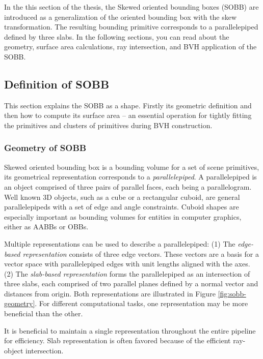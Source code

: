 In the this section of the thesis, the Skewed oriented bounding boxes (SOBB) \cite{KB25} are introduced as a generalization of the oriented bounding box with the skew transformation. The resulting bounding primitive corresponds to a parallelepiped defined by three slabs. In the following sections, you can read about the geometry, surface area calculations, ray intersection, and BVH application of the SOBB.

\subsection{Definition of SOBB}

This section explains the SOBB as a shape. Firstly its geometric definition and then how to compute its surface area -- an essential operation for tightly fitting the primitives and clusters of primitives during BVH construction.

\subsubsection{Geometry of SOBB}

Skewed oriented bounding box is a bounding volume for a set of scene primitives, its geometrical representation corresponds to a \textit{parallelepiped}. A parallelepiped is an object comprised of three pairs of parallel faces, each being a parallelogram. Well known 3D objects, such as a cube or a rectangular cuboid, are general parallelepipeds with a set of edge and angle constraints. Cuboid shapes are especially important as bounding volumes for entities in computer graphics, either as AABBs or OBBs. \cite{KB25}

Multiple representations can be used to describe a parallelepiped: (1) The \textit{edge-based representation} consists of three edge vectors. These vectors are a basis for a vector space with parallelepiped edges with unit lengths aligned with the axes. (2) The \textit{slab-based representation} forms the parallelepiped as an intersection of three slabs, each comprised of two parallel planes defined by a normal vector and distances from origin. Both representations are illustrated in Figure \ref{fig:sobb-geometry}. For different computational tasks, one representation may be more beneficial than the other. \cite{KB25}

It is beneficial to maintain a single representation throughout the entire pipeline for efficiency. Slab representation is often favored because of the efficient ray-object intersection. \cite{KB25}

